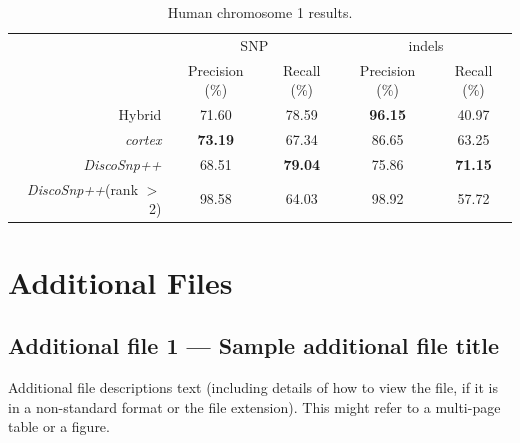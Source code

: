 \documentclass{bmcart}
\newcommand{\discopp}{{\it DiscoSnp++}\xspace}
\newcommand{\co}{{\it cortex}\xspace}
\begin{document}
\begin{backmatter}
	

\begin{table}[h!]
	\caption{Human chromosome 1 results.\label{tab:humanresults}}
	\begin{tabular}{r|cc|cc}
		 & \multicolumn{2}{c|}{SNP} & \multicolumn{2}{c}{indels}\\
		 & Precision (\%) & Recall (\%) & Precision (\%) & Recall (\%) \\\hline
		 Hybrid& 71.60 & 78.59 & \textbf{96.15} & 40.97\\
		 \co& \textbf{73.19} & 67.34 & 86.65 & 63.25 \\
		 \discopp& 68.51 & \textbf{79.04} & 75.86 & \textbf{71.15} \\\hline
		 \discopp (rank $>$ 2)& 98.58 & 64.03 & 98.92 & 57.72 
	\end{tabular}
	\end{table}


\section*{Additional Files}
  \subsection*{Additional file 1 --- Sample additional file title}
    Additional file descriptions text (including details of how to
    view the file, if it is in a non-standard format or the file extension).  This might
    refer to a multi-page table or a figure.


\end{backmatter}
\end{document}
